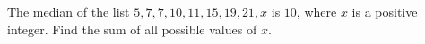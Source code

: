 The median of the list $5,7,7,10,11,15,19,21,x$ is $10$, where $x$ is a positive integer. Find the sum of all possible values of $x$.
